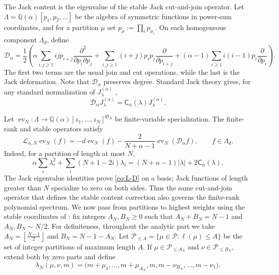 \documentclass[11pt,a4paper,reqno]{article}
\theoremstyle{definition}
\theoremstyle{remark}
\newcommand\Q{{\mathbb Q}}
\newcommand\cA{{\mathsf C}}
\newcommand\Pcal{{\mathcal P}}
\newcommand\Dcal{{\mathcal D}}
\newcommand\ellpart{{\ell}}
\begin{document}
The Jack content is the eigenvalue of the stable Jack cut-and-join operator.  Let $\Lambda=\Q(\alpha)[p_1,p_2,\ldots]$ be the algebra of symmetric functions in power-sum coordinates, and for a partition $\mu$ set $p_\mu:=\prod_i p_{\mu_i}$.  On each homogeneous component $\Lambda_d$, define
\begin{equation}\label{eq:Dalpha}
\Dcal_\alpha=\frac12\left(\alpha\sum_{i,j\geq1}ijp_{i+j}\frac{\partial^2}{\partial p_i\partial p_j}+\sum_{i,j\geq1}(i+j)p_ip_j\frac{\partial}{\partial p_{i+j}}+(\alpha-1)\sum_{i\geq1}i(i-1)p_i\frac{\partial}{\partial p_i}\right).
\end{equation}
The first two terms are the usual join and cut operations, while the last is the Jack deformation.  Note that $\Dcal_\alpha$ preserves degree.  Standard Jack theory gives, for any standard normalization of $J_\lambda^{(\alpha)}$ \cite{Macdonald95,Stanley89},
\begin{equation}\label{eq:Dalpha-eigen}
\Dcal_\alpha J_\lambda^{(\alpha)}=\cA_\alpha(\lambda)J_\lambda^{(\alpha)}.
\end{equation}

Let $\operatorname{ev}_N:\Lambda\to\Q(\alpha)[z_1,\ldots,z_N]^{\mathfrak S_N}$ be finite-variable specialization.  The finite-rank and stable operators satisfy
\begin{equation}\label{eq:L-D}
\mathscr L_{\alpha,N}\operatorname{ev}_N(f) =-d\operatorname{ev}_N(f) -\frac{2}{N+\alpha-1}\operatorname{ev}_N(\Dcal_\alpha f), \qquad f\in\Lambda_d.
\end{equation}
Indeed, for a partition of length at most $N$,
\[
\alpha\sum_i\lambda_i^2+\sum_i(N+1-2i)\lambda_i =(N+\alpha-1)|\lambda|+2\cA_\alpha(\lambda).
\]
The Jack eigenvalue identities prove \eqref{eq:L-D} on a basis; Jack functions of length greater than $N$ specialize to zero on both sides.  Thus the same cut-and-join operator that defines the stable content correction also governs the finite-rank polynomial spectrum.
We now pass from partitions to highest weights using the stable coordinates of \cite{LemMai25,LM2}: fix integers $A_N,B_N\geq0$ such that $A_N+B_N=N-1$ and $A_N,B_N\sim N/2$. For definiteness, throughout the analytic part we take $A_N=\left\lfloor\frac{N-1}{2}\right\rfloor$ and $B_N=N-1-A_N$.  Let $\Pcal_{\leq A}=\{\mu\in\Pcal:\ellpart(\mu)\leq A\}$ be the set of integer partitions of maximum length $A$. If $\mu\in\Pcal_{\leq A_N}$ and $\nu\in\Pcal_{\leq B_N}$, extend both by zero parts and define
\begin{equation}\label{eq:lambda-mun}
\lambda_N(\mu,\nu,m) =\bigl( m+\mu_1,\ldots,m+\mu_{A_N},m, m-\nu_{B_N},\ldots,m-\nu_1 \bigr).
\end{equation}
\end{document}
